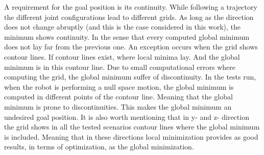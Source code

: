 A requirement for the goal position is its continuity. While following a trajectory the different joint configurations lead to different grids. As long as the direction does not change abruptly (and this is the case considered in this work), the minimum shows continuity. In the sense that every computed global minimum does not lay far from the previous one. An exception occurs when the grid shows contour lines. If contour lines exist, where local minima lay. And the global minimum is in this contour line. Due to small computational errors where computing the grid, the global minimum suffer of discontinuity. In the tests run, when the robot is performing a null space motion, the global minimum is computed in different points of the contour line. Meaning that the global minimum is prone to discontinuities. This makes the global minimum an undesired goal position.
It is also worth mentioning that in y- and z- direction the grid shows in all the tested scenarios contour lines where the global minimum is included. Meaning that in these directions local minimization provides as good results, in terms of optimization, as the global minimization. 
